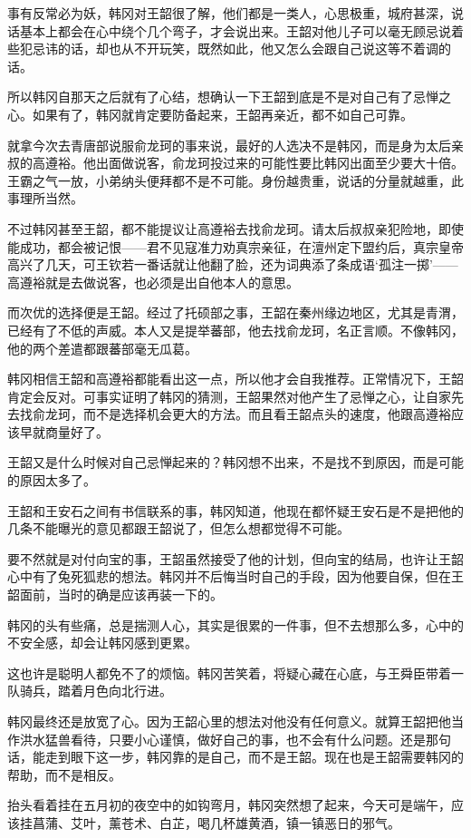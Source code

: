 事有反常必为妖，韩冈对王韶很了解，他们都是一类人，心思极重，城府甚深，说话基本上都会在心中绕个几个弯子，才会说出来。王韶对他儿子可以毫无顾忌说着些犯忌讳的话，却也从不开玩笑，既然如此，他又怎么会跟自己说这等不着调的话。

所以韩冈自那天之后就有了心结，想确认一下王韶到底是不是对自己有了忌惮之心。如果有了，韩冈就肯定要防备起来，王韶再亲近，都不如自己可靠。

就拿今次去青唐部说服俞龙珂的事来说，最好的人选决不是韩冈，而是身为太后亲叔的高遵裕。他出面做说客，俞龙珂投过来的可能性要比韩冈出面至少要大十倍。王霸之气一放，小弟纳头便拜都不是不可能。身份越贵重，说话的分量就越重，此事理所当然。

不过韩冈甚至王韶，都不能提议让高遵裕去找俞龙珂。请太后叔叔亲犯险地，即使能成功，都会被记恨——君不见寇准力劝真宗亲征，在澶州定下盟约后，真宗皇帝高兴了几天，可王钦若一番话就让他翻了脸，还为词典添了条成语‘孤注一掷’——高遵裕就是去做说客，也必须是出自他本人的意思。

而次优的选择便是王韶。经过了托硕部之事，王韶在秦州缘边地区，尤其是青渭，已经有了不低的声威。本人又是提举蕃部，他去找俞龙珂，名正言顺。不像韩冈，他的两个差遣都跟蕃部毫无瓜葛。

韩冈相信王韶和高遵裕都能看出这一点，所以他才会自我推荐。正常情况下，王韶肯定会反对。可事实证明了韩冈的猜测，王韶果然对他产生了忌惮之心，让自家先去找俞龙珂，而不是选择机会更大的方法。而且看王韶点头的速度，他跟高遵裕应该早就商量好了。

王韶又是什么时候对自己忌惮起来的？韩冈想不出来，不是找不到原因，而是可能的原因太多了。

王韶和王安石之间有书信联系的事，韩冈知道，他现在都怀疑王安石是不是把他的几条不能曝光的意见都跟王韶说了，但怎么想都觉得不可能。

要不然就是对付向宝的事，王韶虽然接受了他的计划，但向宝的结局，也许让王韶心中有了兔死狐悲的想法。韩冈并不后悔当时自己的手段，因为他要自保，但在王韶面前，当时的确是应该再装一下的。

韩冈的头有些痛，总是揣测人心，其实是很累的一件事，但不去想那么多，心中的不安全感，却会让韩冈感到更累。

这也许是聪明人都免不了的烦恼。韩冈苦笑着，将疑心藏在心底，与王舜臣带着一队骑兵，踏着月色向北行进。

韩冈最终还是放宽了心。因为王韶心里的想法对他没有任何意义。就算王韶把他当作洪水猛兽看待，只要小心谨慎，做好自己的事，也不会有什么问题。还是那句话，能走到眼下这一步，韩冈靠的是自己，而不是王韶。现在也是王韶需要韩冈的帮助，而不是相反。

抬头看着挂在五月初的夜空中的如钩弯月，韩冈突然想了起来，今天可是端午，应该挂菖蒲、艾叶，薰苍术、白芷，喝几杯雄黄酒，镇一镇恶日的邪气。

